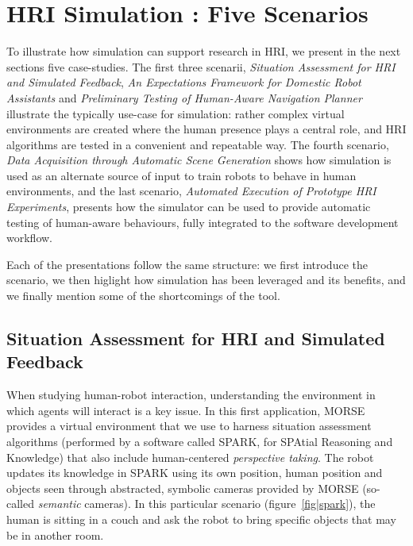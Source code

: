\documentclass[conference]{IEEEtran}
\begin{document}
\section{HRI Simulation : Five Scenarios}

To illustrate how simulation can support research in HRI, we present in the next
sections five case-studies.  The first three scenarii, \emph{Situation
Assessment for HRI and Simulated Feedback}, \emph{An Expectations Framework for
Domestic Robot Assistants} and \emph{Preliminary Testing of Human-Aware
Navigation Planner} illustrate the typically use-case for simulation: rather
complex virtual environments are created where the human presence plays a
central role, and HRI algorithms are tested in a convenient and repeatable way.
The fourth scenario, \emph{Data Acquisition through Automatic Scene Generation}
shows how simulation is used as an alternate source of input to train robots to
behave in human environments, and the last scenario, \emph{Automated Execution
of Prototype HRI Experiments}, presents how the simulator can be used to provide
automatic testing of human-aware behaviours, fully integrated to the software
development workflow.

Each of the presentations follow the same structure: we first introduce the
scenario, we then higlight how simulation has been leveraged and its benefits,
and we finally mention some of the shortcomings of the tool.

\subsection{Situation Assessment for HRI and Simulated Feedback}
\label{sc:assessment}

When studying human-robot interaction, understanding the environment in which
agents will interact is a key issue. In this first application, MORSE provides a
virtual environment that we use to harness situation assessment algorithms
(performed by a software called SPARK, for SPAtial Reasoning and Knowledge) that
also include human-centered \emph{perspective taking}. The robot updates its
knowledge in SPARK using its own position, human position and objects seen
through abstracted, symbolic cameras provided by MORSE (so-called
\emph{semantic} cameras). In this particular scenario (figure~\ref{fig|spark}),
the human is sitting in a couch and ask the robot to bring specific objects that
may be in another room.
\end{document}
